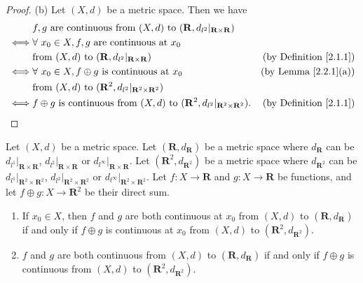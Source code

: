 \begin{proof}{(b)}
    Let \((X, d)\) be a metric space.
    Then we have
    \begin{align*}
             & f, g \text{ are continuous from } (X, d) \text{ to } (\mathbf{R}, d_{l^2}|_{\mathbf{R} \times \mathbf{R}})                                                  \\
        \iff & \forall\ x_0 \in X, f, g \text{ are continuous at } x_0                                                                                                     \\
             & \text{from } (X, d) \text{ to } (\mathbf{R}, d_{l^2}|_{\mathbf{R} \times \mathbf{R}})                                  & \text{(by Definition \ref{2.1.1})} \\
        \iff & \forall\ x_0 \in X, f \oplus g \text{ is continuous at } x_0                                                           & \text{(by Lemma \ref{2.2.1}(a))}   \\
             & \text{from } (X, d) \text{ to } (\mathbf{R}^2, d_{l^2}|_{\mathbf{R}^2 \times \mathbf{R}^2})                                                                 \\
        \iff & f \oplus g \text{ is continuous from } (X, d) \text{ to } (\mathbf{R}^2, d_{l^2}|_{\mathbf{R}^2 \times \mathbf{R}^2}). & \text{(by Definition \ref{2.1.1})}
    \end{align*}
\end{proof}

\begin{additional corollary}\label{ac 2.2.1}
Let \((X, d)\) be a metric space.
Let \((\mathbf{R}, d_{\mathbf{R}})\) be a metric space where \(d_{\mathbf{R}}\) can be \(d_{l^1}|_{\mathbf{R} \times \mathbf{R}}\), \(d_{l^2}|_{\mathbf{R} \times \mathbf{R}}\) or \(d_{l^\infty}|_{\mathbf{R} \times \mathbf{R}}\).
Let \((\mathbf{R}^2, d_{\mathbf{R}^2})\) be a metric space where \(d_{\mathbf{R}^2}\) can be \(d_{l^1}|_{\mathbf{R}^2 \times \mathbf{R}^2}\), \(d_{l^2}|_{\mathbf{R}^2 \times \mathbf{R}^2}\) or \(d_{l^\infty}|_{\mathbf{R}^2 \times \mathbf{R}^2}\).
Let \(f : X \to \mathbf{R}\) and \(g : X \to \mathbf{R}\) be functions, and let \(f \oplus g : X \to \mathbf{R}^2\) be their direct sum.
\begin{enumerate}
    \item If \(x_0 \in X\), then \(f\) and \(g\) are both continuous at \(x_0\) from \((X, d)\) to \((\mathbf{R}, d_{\mathbf{R}})\) if and only if \(f \oplus g\) is continuous at \(x_0\) from \((X, d)\) to \((\mathbf{R}^2, d_{\mathbf{R}^2})\).
    \item \(f\) and \(g\) are both continuous from \((X, d)\) to \((\mathbf{R}, d_{\mathbf{R}})\) if and only if \(f \oplus g\) is continuous from \((X, d)\) to \((\mathbf{R}^2, d_{\mathbf{R}^2})\).
\end{enumerate}
\end{additional corollary}

